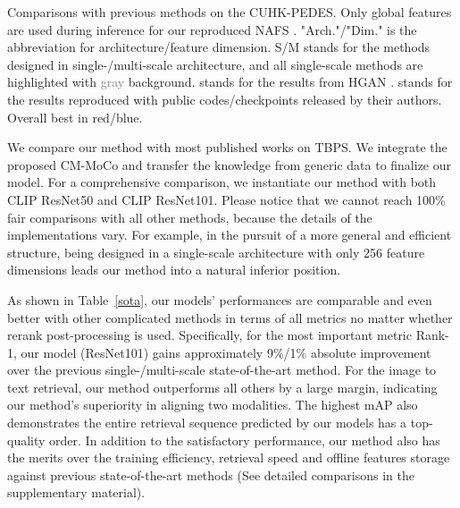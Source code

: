 \documentclass{bmvc2k}
\newcommand{\first}[1]{\textcolor{myred}{#1}}
\newcommand{\second}[1]{\textcolor{myblue}{#1}}
\newcommand{\revision}[1]{#1}
\begin{document}
\begin{table}[t]
\begin{center}
{}
\end{center}
\caption{Comparisons with previous methods on the CUHK-PEDES. \revision{Only global features are used during inference for our reproduced NAFS \cite{gao2021contextual}. "Arch."/"Dim." is the abbreviation for architecture/feature dimension. S/M stands for the methods designed in single-/multi-scale architecture, and all single-scale methods are highlighted with \textcolor{gray}{gray} background.}  stands for the results from HGAN \cite{zheng2020hierarchical}.  stands for the results reproduced with public codes/checkpoints released by their authors. Overall  best in \first{red}/\second{blue}.}
\label{sota}
\end{table}
 We compare our method with most published works on TBPS. 
We integrate the proposed CM-MoCo and transfer the knowledge from generic data to finalize our model. 
For a comprehensive comparison, we instantiate our method with both CLIP ResNet50 and CLIP ResNet101.
\revision{Please notice that we cannot reach 100\% fair comparisons with all other methods, because the details of the implementations vary. For example, in the pursuit of a more general and efficient structure, being designed in a single-scale architecture with only 256 feature dimensions leads our method into a natural inferior position.}

As shown in Table~\ref{sota}, our models' performances are comparable and even better with other complicated methods in terms of all metrics no matter whether rerank post-processing is used.
Specifically, for the most important metric Rank-1, our model (ResNet101) gains approximately 9\%/1\% absolute improvement over the previous single-/multi-scale state-of-the-art method. 
\revision{For the image to text retrieval, our method outperforms all others by a large margin, indicating our method's superiority in aligning two modalities. The highest mAP also demonstrates the entire retrieval sequence predicted by our models has a top-quality order. In addition to the satisfactory performance, our method also has the merits over the training efficiency, retrieval speed and offline features storage against previous state-of-the-art methods (See detailed comparisons in the supplementary material).}
\end{document}
